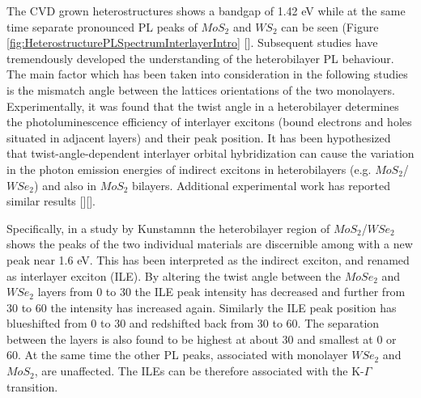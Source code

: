 The CVD grown heterostructures shows a bandgap of 1.42 eV while at the same time separate pronounced PL peaks of $MoS_2$ and $WS_2$ can be seen (Figure \ref{fig:HeterostructurePLSpectrumInterlayerIntro} [].  
Subsequent studies have tremendously developed the understanding of the heterobilayer PL behaviour. The main factor which has been taken into consideration in the following studies is the mismatch angle between the lattices orientations of the two monolayers.
Experimentally, it was found that the twist angle in a heterobilayer determines the photoluminescence efficiency of interlayer excitons (bound  electrons and holes situated in adjacent layers) and their peak position.
It has been hypothesized that twist-angle-dependent interlayer orbital hybridization can cause the variation in the photon emission energies of indirect excitons in heterobilayers (e.g. $MoS_2$/$WSe_2$) and also in $MoS_2$ bilayers. Additional experimental work has reported similar results [][]. 

Specifically, in a study by Kunstamnn \cite{Kunstmann2018} the heterobilayer region of $MoS_2$/$WSe_2$ shows the peaks of the two individual materials are discernible among with a new peak near 1.6 eV. This has been interpreted as the indirect exciton, and renamed as interlayer exciton (ILE). By altering the twist angle between the $MoSe_2$ and $WSe_2$ layers from 0{\degree} to 30{\degree} the ILE peak intensity has decreased and further from 30{\degree} to 60{\degree} the intensity has increased again. Similarly the ILE peak position has blueshifted from 0{\degree} to 30{\degree} and redshifted back from 30{\degree} to 60{\degree}. The separation between the layers is also found to be highest at about 30{\degree} and smallest at 0{\degree} or 60{\degree}. At the same time the other PL peaks, associated with monolayer $WSe_2$ and $MoS_2$, are unaffected. The ILEs can be therefore associated with the K-$\Gamma$ transition.

